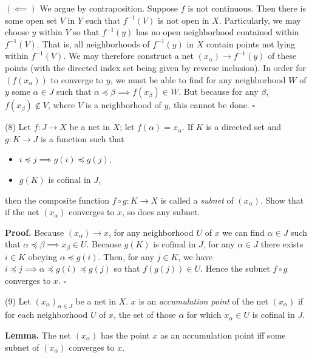 \documentclass[a4paper]{article}
\begin{document}
$(\impliedby)$ We argue by contraposition. Suppose $f$ is not continuous. Then there is some open set $V$ in $Y$ such that $f^{-1}(V)$ is not open in $X$. Particularly, we may choose $y$ within $V$ so that $f^{-1}(y)$ has no open neighborhood contained within $f^{-1}(V)$. That is, all neighborhoods of $f^{-1}(y)$ in $X$ contain points not lying within $f^{-1}(V)$. We may therefore construct a net $(x_\alpha) \to f^{-1}(y)$ of these points (with the directed index set being given by reverse inclusion). In order for $(f(x_\alpha))$ to converge to $y$, we must be able to find for any neighborhood $W$ of $y$ some $\alpha \in J$ such that $\alpha \preceq \beta \implies f(x_\beta) \in W$. But because for any $\beta$, $f(x_\beta) \notin V$, where $V$ is a neighborhood of $y$, this cannot be done. $\square$

\vspace{0.5cm}

(8) Let $f : J \to X$ be a net in $X$; let $f(\alpha) = x_\alpha$. If $K$ is a directed set and $g : K \to J$ is a function such that

\begin{itemize}
    \item $i \preceq j \implies g(i) \preceq g(j)$,
    \item $g(K)$ is cofinal in $J$,
\end{itemize}

then the composite function $f \circ g : K \to X$ is called a \emph{subnet} of $(x_\alpha)$. Show that if the net $(x_\alpha)$ converges to $x$, so does any subnet.

\textbf{Proof.} Because $(x_\alpha) \to x$, for any neighborhood $U$ of $x$ we can find $\alpha \in J$ such that $\alpha \preceq \beta \implies x_\beta \in U$. Because $g(K)$ is cofinal in $J$, for any $\alpha \in J$ there exists $i \in K$ obeying $\alpha \preceq g(i)$. Then, for any $j \in K$, we have $i \preceq j \implies \alpha \preceq g(i) \preceq g(j)$ so that $f(g(j)) \in U$. Hence the subnet $f \circ g$ converges to $x$. $\square$

\vspace{0.5cm}

(9) Let $(x_\alpha)_{\alpha \in J}$ be a net in $X$. $x$ is an \emph{accumulation point} of the net $(x_\alpha)$ if for each neighborhood $U$ of $x$, the set of those $\alpha$ for which $x_\alpha \in U$ is cofinal in $J$.

\textbf{Lemma.} The net $(x_\alpha)$ has the point $x$ as an accumulation point iff some subnet of $(x_\alpha)$ converges to $x$.
\end{document}
